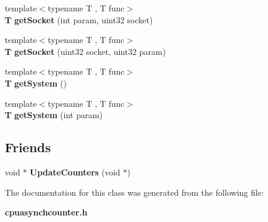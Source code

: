 \begin{DoxyCompactItemize}
\item 
{\footnotesize template$<$typename T , T  func$>$ }\\{\bf T} {\bfseries get\+Socket} (int param, uint32 socket)\label{classAsynchronCounterState_aba3224acb89e692bb7024c85a516b8cb}

\item 
{\footnotesize template$<$typename T , T  func$>$ }\\{\bf T} {\bfseries get\+Socket} (uint32 socket, uint32 param)\label{classAsynchronCounterState_ac5441bad9ff3aaccbe5b3b8965e091d2}

\item 
{\footnotesize template$<$typename T , T  func$>$ }\\{\bf T} {\bfseries get\+System} ()\label{classAsynchronCounterState_aa474d444ebe77a8c7e94c904e87879ae}

\item 
{\footnotesize template$<$typename T , T  func$>$ }\\{\bf T} {\bfseries get\+System} (int param)\label{classAsynchronCounterState_a689f439c1e0f3b68401a0dd4341b46f0}

\end{DoxyCompactItemize}
\subsection*{Friends}
\begin{DoxyCompactItemize}
\item 
void $\ast$ {\bfseries Update\+Counters} (void $\ast$)\label{classAsynchronCounterState_a972a576e955b250f38283c8c165a6c7a}

\end{DoxyCompactItemize}


The documentation for this class was generated from the following file\+:\begin{DoxyCompactItemize}
\item 
{\bf cpuasynchcounter.\+h}\end{DoxyCompactItemize}

